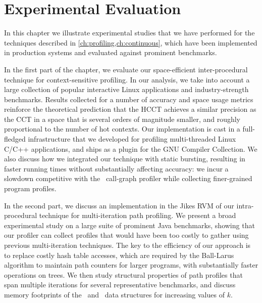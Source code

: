 \chapter{Experimental Evaluation}
\label{ch:experiments}

In this chapter we illustrate experimental studies that we have performed for the techniques described in \mychapter\ref{ch:profiling,ch:continuous}, which have been implemented in production systems and evaluated against prominent benchmarks.  


In the first part of the chapter, we evaluate our space-efficient inter-procedural technique for context-sensitive profiling. In our analysis, we take into account a large collection of popular interactive Linux applications and industry-strength benchmarks. Results collected for a number of accuracy and space usage metrics reinforce the theoretical prediction that the HCCT achieves a similar precision as the CCT in a space that is several orders of magnitude smaller, and roughly proportional to the number of hot contexts. Our implementation is cast in a full-fledged infrastructure that we developed for profiling multi-threaded Linux C/C++ applications, and ships as a plugin for the GNU Compiler Collection. We also discuss how we integrated our technique with static bursting, resulting in faster running times without substantially affecting accuracy: we incur a slowdown competitive with the \gprof\ call-graph profiler while collecting finer-grained program profiles. 

In the second part, we discuss an implementation in the Jikes RVM of our intra-procedural technique for multi-iteration path profiling. We present a broad experimental study on a large suite of prominent Java benchmarks, showing that our profiler can collect profiles that would have been too costly to gather using previous multi-iteration techniques. The key to the efficiency of our approach is to replace costly hash table accesses, which are  required by the Ball-Larus algorithm to maintain path counters for larger programs, with substantially faster operations on trees. We then study structural properties of path profiles that span multiple iterations for several representative benchmarks, and discuss memory footprints of the \ksf\ and \kipf\ data structures for increasing values of $k$.

